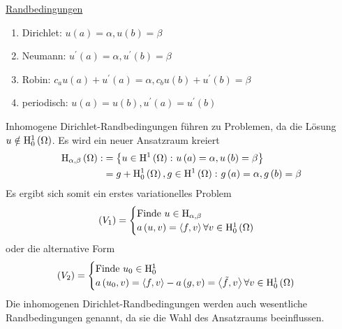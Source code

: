 \underline{Randbedingungen}
\begin{enumerate}
	\item Dirichlet: $u\left(a\right)=\alpha, u\left(b\right)=\beta${}
	\item Neumann: $u^{\prime}\left(a\right)=\alpha, u^{\prime}\left(b\right)=\beta${}
	\item Robin: $c_{a}u\left(a\right) + u^{\prime}\left(a\right) = \alpha, c_{b}u\left(b\right)+u^{\prime}\left(b\right)=\beta${}
	\item periodisch: $u\left(a\right)=u\left(b\right), u^{\prime}\left(a\right)=u^{\prime}\left(b\right)$
\end{enumerate}

Inhomogene Dirichlet-Randbedingungen führen zu Problemen, da die Lösung $u\notin\mathrm{H}^{1}_{0}\left(\Omega\right)$. Es wird ein neuer Ansatzraum kreiert
\begin{align*}
	\mathrm{H}_{\alpha,\beta}\left(\Omega\right) :&= \left\{u\in\mathrm{H}^{1}\left(\Omega\right)\colon u\left(a\right)=\alpha, u\left(b\right)=\beta\right\}\\
		&= g+\mathrm{H}^{1}_{0}\left(\Omega\right), g\in\mathrm{H}^{1}\left(\Omega\right)\colon g\left(a\right)=\alpha, g\left(b\right)=\beta
\end{align*}
Es ergibt sich somit ein erstes variationelles Problem
\begin{equation*}
	\left(V_{1}\right) = \begin{cases}
		\text{Finde }u\in\mathrm{H}_{\alpha,\beta}\\
		a\left(u,v\right) = \left<f,v\right> \forall v\in\mathrm{H}^{1}_{0}\left(\Omega\right)
	\end{cases}
\end{equation*}
oder die alternative Form
\begin{equation*}
	\left(V_{2}\right) = \begin{cases}
		\text{Finde }u_{0}\in\mathrm{H}^{1}_{0}\\
		a\left(u_{0},v\right) = \left<f,v\right>-a\left(g,v\right) = \left<\tilde{f},v\right> \forall v\in\mathrm{H}^{1}_{0}\left(\Omega\right)
	\end{cases}
\end{equation*}
Die inhomogenen Dirichlet-Randbedingungen werden auch wesentliche Randbedingungen genannt, da sie die Wahl des Ansatzraums beeinflussen.

